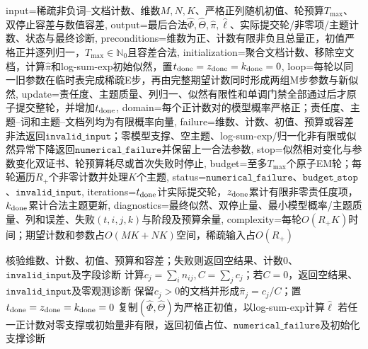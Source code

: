 \begin{AlgorithmContract}{
  input={稀疏非负词--文档计数、维数$M,N,K$、严格正列随机初值、轮预算$T_{\max}$、双停止容差与数值容差},
  output={最后合法$\widehat\Phi,\widehat\Theta,\widehat\pi,\widehat\ell$、实际提交轮/非零项/主题计数、状态与最终诊断},
  preconditions={维数为正、计数有限非负且总量正，初值严格正并逐列归一，$T_{\max}\in\mathbb N_0$且容差合法},
  initialization={聚合文档计数、移除空文档，计算$\widehat\pi$和log-sum-exp初始似然，置$t_{\rm done}=z_{\rm done}=k_{\rm done}=0$},
  loop={每轮以同一旧参数在临时表完成稀疏E步，再由完整期望计数同时形成两组M步参数与新似然},
  update={责任度、主题质量、列归一、似然有限性和单调门禁全部通过后才原子提交整轮，并增加$t_{\rm done}$},
  domain={每个正计数对的模型概率严格正；责任度、主题--词和主题--文档列均为有限概率向量},
  failure={维数、计数、初值、预算或容差非法返回$\mathtt{invalid\_input}$；零模型支撑、空主题、log-sum-exp/归一化非有限或似然异常下降返回$\mathtt{numerical\_failure}$并保留上一合法参数},
  stop={似然相对变化与参数变化双证书、轮预算耗尽或首次失败时停止},
  budget={至多$T_{\max}$个原子EM轮；每轮遍历$R_+$个非零计数并处理$K$个主题},
  status={$\mathtt{numerical\_failure}$、$\mathtt{budget\_stop}$、$\mathtt{invalid\_input}$},
  iterations={$t_{\rm done}$计实际提交轮，$z_{\rm done}$累计有限非零责任度项，$k_{\rm done}$累计合法主题更新},
  diagnostics={最终似然、双停止量、最小模型概率/主题质量、列和误差、失败$(t,i,j,k)$与阶段及预算余量},
  complexity={每轮$O(R_+K)$时间；期望计数和参数占$O(MK+NK)$空间，稀疏输入占$O(R_+)$}
}
\begin{algorithm}[tbp]
\caption{稀疏共现计数上的PLSA EM训练}\label{alg:V4-C06-plsa-em}
核验维数、计数、初值、预算和容差；失败则返回空结果、计数$0$、$\mathtt{invalid\_input}$及字段诊断\;
计算$c_j=\sum_i n_{ij},C=\sum_jc_j$；若$C=0$，返回空结果、$\mathtt{invalid\_input}$及零观测诊断\;
保留$c_j>0$的文档并形成$\widehat\pi_j=c_j/C$；置$t_{\rm done}=z_{\rm done}=k_{\rm done}=0$\;
复制$(\widehat\Phi,\widehat\Theta)$为严格正初值，以log-sum-exp计算$\widehat\ell$\;
若任一正计数对零支撑或初始量非有限，返回初值占位、$\mathtt{numerical\_failure}$及初始化支撑诊断\;
\end{algorithm}
\end{AlgorithmContract}
